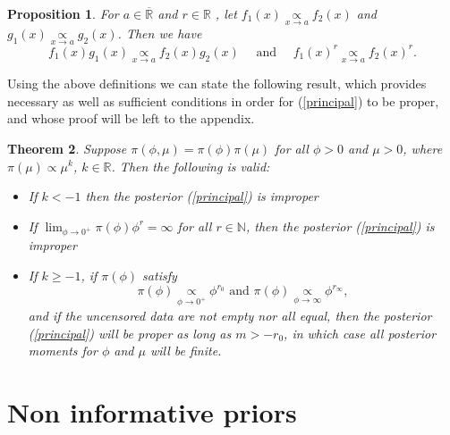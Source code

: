\documentclass[12pt]{article} %
\theoremstyle{plain}%
\newtheorem{theorem}{Theorem}[section]
\newtheorem{proposition}[theorem]{Proposition}
\theoremstyle{definition}
\theoremstyle{remark}
\begin{document}
\begin{proposition}\label{properties} For $a\in\overline{\mathbb{R}}$ and $r\in\mathbb{R}$ , let $f_1(x)\underset{x\to a}{\propto} f_2(x)$ and $g_1(x)\underset{x\to a}{\propto} g_2(x)$. Then we have
\begin{equation*}
f_1(x)g_1(x)\underset{x\to a}{\propto}f_2(x)g_2(x) \quad \mbox{ and } \quad f_1(x)^r\underset{x\to a}{\propto}f_2(x)^r.
\end{equation*}

\end{proposition} 

Using the above definitions we can state the following result, which provides necessary as well as sufficient conditions in order for (\ref{principal}) to be proper, and whose proof will be left to the appendix.

\begin{theorem}\label{mainth} Suppose $\pi(\phi,\mu) = \pi(\phi)\pi(\mu)$ for all $\phi>0$ and $\mu>0$, where $\pi(\mu)\propto \mu^k$, $k\in \mathbb{R}$. Then the following is valid:
\begin{itemize}
    \item[(i)] If $k< -1$ then the posterior (\ref{principal}) is improper
    \item[(ii)] If $\lim_{\phi\to 0^+}\pi(\phi)\phi^r = \infty$ for all $r\in \mathbb{N}$, then the posterior (\ref{principal}) is improper
    \item[(iii)] If $k\geq -1$, if $\pi(\phi)$ satisfy
    \begin{equation*} \pi(\phi)\underset{\phi\to 0^+}{\propto} \phi^{r_0}\mbox{ and }\pi(\phi)\underset{\phi\to \infty}{\propto} \phi^{r_\infty},
    \end{equation*}
    and if the uncensored data are not empty nor all equal, then the posterior (\ref{principal}) will be proper as long as $m>-r_0$, in which case all posterior moments for $\phi$ and $\mu$ will be finite.
\end{itemize}

\end{theorem}

\section{Non informative priors}\label{sec:3}
\end{document}
